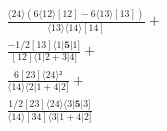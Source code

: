 \documentclass[varwidth, border=5pt]{standalone}
\begin{document}
\begin{my}
$\begin{gathered}
\scriptscriptstyle\frac{⟨24⟩(6⟨12⟩[12]-6⟨13⟩[13])}{⟨13⟩⟨14⟩[14]} +\\
\scriptscriptstyle\frac{-1/2[13]⟨1|𝟓|1]}{[12]⟨1|2+3|4]} +\\
\scriptscriptstyle\frac{6[23]⟨24⟩²}{⟨14⟩⟨2|1+4|2]} +\\
\scriptscriptstyle\frac{1/2[23]⟨24⟩⟨3|𝟓|3]}{⟨14⟩[34]⟨3|1+4|2]} \phantom{+}
\end{gathered}$
\end{my}
\end{document}
